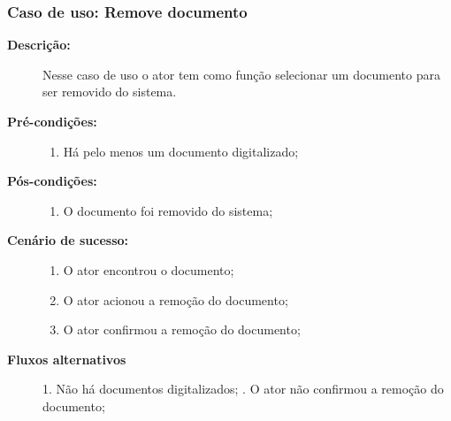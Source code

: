 \subsubsection{Caso de uso: Remove documento}
\begin{description}
    \item[{\bf Descrição:}] Nesse caso de uso o ator tem como função selecionar um documento para ser removido do sistema.
    \item[{\bf Pré-condições:}]
        \begin{enumerate}
            \item Há pelo menos um documento digitalizado;
        \end{enumerate}
    \item[{\bf Pós-condições:}] 
        \begin{enumerate}
            \item O documento foi removido do sistema;
        \end{enumerate}
    
    \item[{\bf Cenário de sucesso:}]
        \begin{enumerate}
            \item O ator encontrou o documento;
            \item O ator acionou a remoção do documento;
            \item O ator confirmou a remoção do documento;
        \end{enumerate}

    \item[{\bf Fluxos alternativos}]
        1. Não há documentos digitalizados; . O ator não confirmou a remoção do documento;
\end{description}

